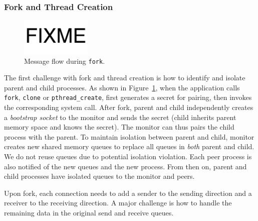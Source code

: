 
\subsubsection{Fork and Thread Creation}
\label{subsubsec:fork_fork}


\begin{figure}[t]
	\centering
	\includegraphics[width=0.3\textwidth]{images/fixme}
	\caption{Message flow during \texttt{fork}.}
	\label{fig:fork-fork}
\end{figure}


The first challenge with fork and thread creation is how to identify and isolate parent and child processes. As shown in Figure~\ref{fig:fork-fork}, when the application calls \texttt{fork}, \texttt{clone} or \texttt{pthread\_create}, \libipc{} first generates a secret for pairing, then invokes the corresponding system call. After fork, parent and child independently creates a \textit{bootstrap socket} to the monitor and sends the secret (child inherits parent memory space and knows the secret). The monitor can thus pairs the child process with the parent. 
To maintain isolation between parent and child, monitor creates new shared memory queues to replace all queues in \emph{both} parent and child. We do not reuse queues due to potential isolation violation. %
Each peer process is also notified of the new queues and the new process. From then on, parent and child processes have isolated queues to the monitor and peers.

Upon fork, each connection needs to add a sender to the sending direction and a receiver to the receiving direction. A major challenge is how to handle the remaining data in the original send and receive queues.


